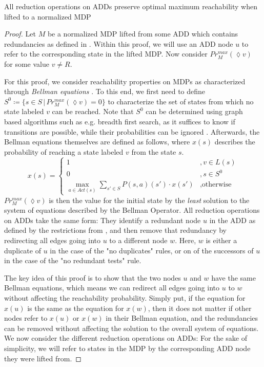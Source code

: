 \begin{lemma}\label{ReductionSoundnessLemma}
	All reduction operations on ADDs preserve optimal maximum reachability when lifted to a normalized MDP
\end{lemma}
\begin{proof}
	Let $M$ be a normalized MDP lifted from some ADD which contains redundancies as defined in . 
	Within this proof, we will use an ADD node $u$ to refer to the corresponding state in the lifted MDP.
	Now consider $Pr^{max}_M (\lozenge v)$ for some value $v \neq R$.
	
	For this proof, we consider reachability properties on MDPs as characterized through \textit{Bellman equations} \cite{forejt2011automated}.
	To this end, we first need to define $S^0 \coloneqq \{s \in S \,|\, Pr^{max}_M (\lozenge v) = 0\}$ to characterize the set of states from which no state labeled $v$ can be reached.
	Note that $S^0$ can be determined using graph based algorithms such as e.g. breadth first search, as it suffices to know if transitions are possible, while their probabilities can be ignored \cite{forejt2011automated}.
	Afterwards, the Bellman equations themselves are defined as follows, where $x(s)$ describes the probability of reaching a state labeled $v$ from the state $s$.
	$$ x(s) = \begin{cases}
		1 &, v \in L(s)\\
		0 &, s \in S^0\\
		\max\limits_{a \in \mathit{Act(s)}} \sum\limits_{s' \in S} P(s, a)(s') \cdot x(s') &,\text{otherwise}
	\end{cases}$$
	$Pr^{max}_M (\lozenge v)$ is then the value for the initial state by the \textit{least} solution to the system of equations described by the Bellman Operator.
	All reduction operations on ADDs take the same form:
	They identify a redundant node $u$ in the ADD as defined by the restrictions from , and then remove that redundancy by redirecting all edges going into $u$ to a different node $w$. 
	Here, $w$ is either a duplicate of $u$ in the case of the "no duplicates" rules, or on of the successors of $u$ in the case of the "no redundant tests" rule.
	
	The key idea of this proof is to show that the two nodes $u$ and $w$ have the same Bellman equations, which means we can redirect all edges going into $u$ to $w$ without affecting the reachability probability. 
	Simply put, if the equation for $x(u)$  is the same as the equation for $x(w)$, then it does not matter if other nodes refer to $x(u)$ or $x(w)$ in their Bellman equation, and the redundancies can be removed without affecting the solution to the overall system of equations.
	We now consider the different reduction operations on ADDs:
	For the sake of simplicity, we will refer to states in the MDP by the corresponding ADD node they were lifted from.
	

\end{proof}
